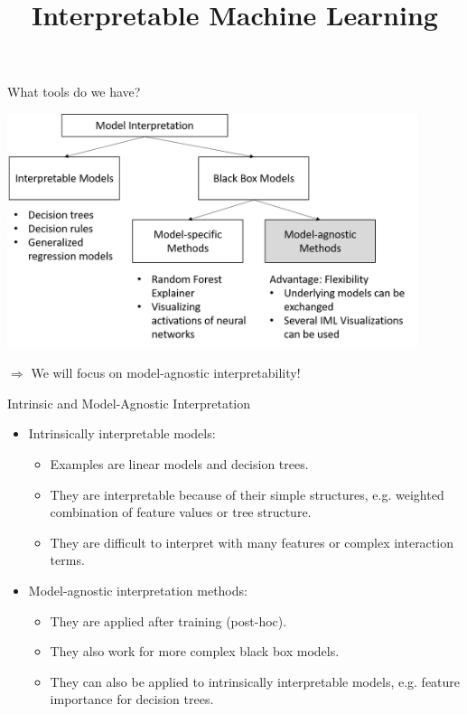 \documentclass[11pt,compress,t,notes=noshow, xcolor=table]{beamer}
\title{Interpretable Machine Learning}
\institute{\href{https://compstat-lmu.github.io/lecture_iml/}{compstat-lmu.github.io/lecture\_iml}}
\date{}
\begin{document}


\newcommand{\titlefigure}{figure/open_blackbox}
\newcommand{\learninggoals}{
\item Fundamental Terms and Concepts}



\begin{vbframe}{What tools do we have?}
 \begin{center}
  \includegraphics[width=0.9\textwidth]{figure/overview}
 \end{center}
 $\Rightarrow$ We will focus on model-agnostic interpretability!
\end{vbframe}

\begin{vbframe}{Intrinsic and Model-Agnostic Interpretation}
\begin{itemize}
  \item Intrinsically interpretable models:
  \begin{itemize}
  \item Examples are linear models and decision trees.
  \item They are interpretable because of their simple structures, e.g. 
  weighted combination of feature values or tree structure. 
  \item They are difficult to interpret with many features or complex interaction terms.
  \end{itemize}
  \lz
  \item Model-agnostic interpretation methods:
  \begin{itemize}
  \item They are applied after training (post-hoc).
  \item They also work for more complex black box models.
  \item They can also be applied to intrinsically interpretable models, e.g.
    feature importance for decision trees. 
  \end{itemize}
\end{itemize}
\end{vbframe}
\end{document}
